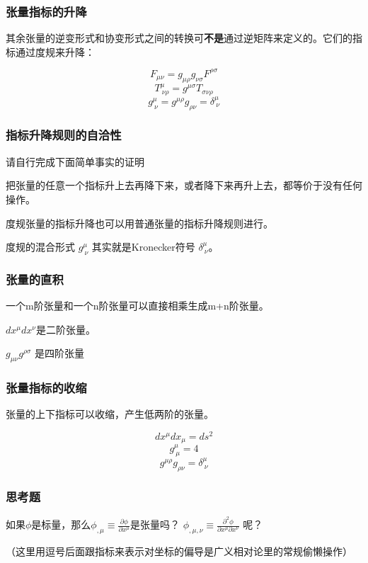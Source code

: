 \documentclass[CJK,13pt]{beamer}
\begin{document}
\begin{frame}
\frametitle{ 张量指标的升降}

其余张量的逆变形式和协变形式之间的转换可{\bf 不是}通过逆矩阵来定义的。它们的{\blue 指标通过度规来升降}：

\skipline

\bex
$$F_{\mu\nu} = g_{\mu\rho}g_{\nu\sigma}F^{\rho\sigma}$$
$$T^{\mu}_{\ \nu\rho} = g^{\mu\sigma} T_{\sigma\nu\rho}$$
$$g^{\mu}_{\ \nu} = g^{\mu\rho}g_{\rho\nu} = \delta^{\mu}_{\ \nu}$$
\eex
\end{frame}

\begin{frame}
  \frametitle{指标升降规则的自洽性}
  请自行完成下面简单事实的证明
  \bitem
\item{把张量的任意一个指标升上去再降下来，或者降下来再升上去，都等价于没有任何操作。}
\item{度规张量的指标升降也可以用普通张量的指标升降规则进行。}
\item{度规的混合形式 $g^\mu_{\ \nu}$ 其实就是Kronecker符号 $\delta^\mu_{\ \nu}$。}
  \eitem
\end{frame}


\begin{frame}
\frametitle{ 张量的直积}

一个m阶张量和一个n阶张量可以直接相乘生成m+n阶张量。

\skipline

\bex
$dx^\mu dx^\nu$是二阶张量。

$g_{\mu\nu}g^{\rho\sigma}$ 是四阶张量
\eex

\end{frame}



\begin{frame}
\frametitle{ 张量指标的收缩}

张量的上下指标可以收缩，产生低两阶的张量。

\skipline

\bex
$$dx^\mu dx_\mu = ds^2$$
$$g^{\mu}_{\ \mu} = 4$$
$$g^{\mu\rho}g_{\rho\nu} = \delta^{\mu}_{\ \nu}$$
\eex
\end{frame}


\begin{frame}
\frametitle{思考题}

如果$\phi$是标量，那么$\phi_{,\mu} \equiv \frac{\partial \phi}{\partial x^\mu}$是张量吗？ $\phi_{,\mu,\nu}\equiv \frac{\partial^2 \phi}{\partial x^\mu\partial x^\nu}$ 呢？



（这里{\blue 用逗号后面跟指标来表示对坐标的偏导}是广义相对论里的常规偷懒操作）
\end{frame}
\end{document}
